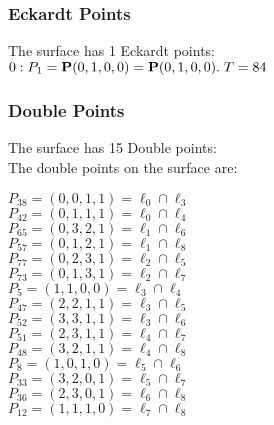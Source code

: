 \documentclass{article}
\newcommand{\bP}{{\bf P}}
\begin{document}
{\subsubsection*{Eckardt Points}
The surface has 1 Eckardt points:\\
$0 : P_{1}=\bP(0, 1, 0, 0) = \bP(0, 1, 0, 0).\; T= 84$\\
\subsubsection*{Double Points}
The surface has 15 Double points:\\
The double points on the surface are:\\
\begin{multicols}{2}
\noindent
$P_{38} = ( 0, 0, 1, 1 ) = \ell_{0} \cap \ell_{3} $\\
$P_{42} = ( 0, 1, 1, 1 ) = \ell_{0} \cap \ell_{4} $\\
$P_{65} = ( 0, 3, 2, 1 ) = \ell_{1} \cap \ell_{6} $\\
$P_{57} = ( 0, 1, 2, 1 ) = \ell_{1} \cap \ell_{8} $\\
$P_{77} = ( 0, 2, 3, 1 ) = \ell_{2} \cap \ell_{5} $\\
$P_{73} = ( 0, 1, 3, 1 ) = \ell_{2} \cap \ell_{7} $\\
$P_{5} = ( 1, 1, 0, 0 ) = \ell_{3} \cap \ell_{4} $\\
$P_{47} = ( 2, 2, 1, 1 ) = \ell_{3} \cap \ell_{5} $\\
$P_{52} = ( 3, 3, 1, 1 ) = \ell_{3} \cap \ell_{6} $\\
$P_{51} = ( 2, 3, 1, 1 ) = \ell_{4} \cap \ell_{7} $\\
$P_{48} = ( 3, 2, 1, 1 ) = \ell_{4} \cap \ell_{8} $\\
$P_{8} = ( 1, 0, 1, 0 ) = \ell_{5} \cap \ell_{6} $\\
$P_{33} = ( 3, 2, 0, 1 ) = \ell_{5} \cap \ell_{7} $\\
$P_{36} = ( 2, 3, 0, 1 ) = \ell_{6} \cap \ell_{8} $\\
$P_{12} = ( 1, 1, 1, 0 ) = \ell_{7} \cap \ell_{8} $\\
\end{multicols}
}
\end{document}
